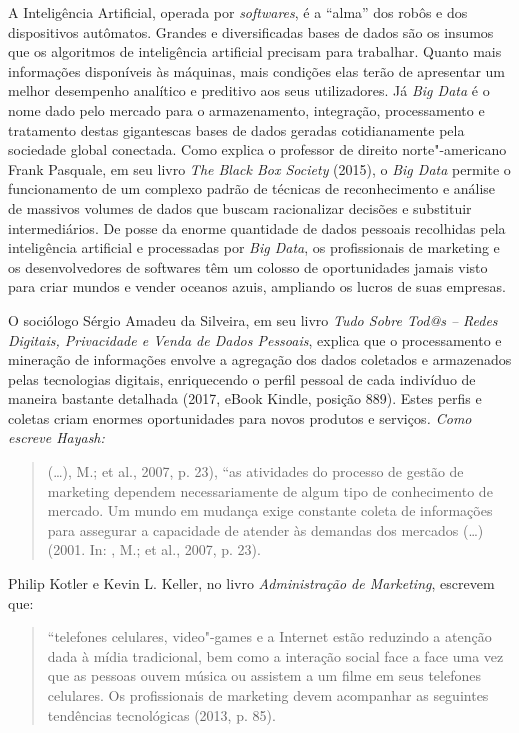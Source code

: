 A Inteligência Artificial, operada por \emph{softwares}, é a ``alma''
dos robôs e dos dispositivos autômatos. Grandes e diversificadas bases
de dados são os insumos que os algoritmos de inteligência artificial
precisam para trabalhar. Quanto mais informações disponíveis às
máquinas, mais condições elas terão de apresentar um melhor desempenho
analítico e preditivo aos seus utilizadores. Já \emph{Big Data} é o nome
dado pelo mercado para o armazenamento, integração, processamento e
tratamento destas gigantescas bases de dados geradas cotidianamente pela
sociedade global conectada. Como explica o professor de direito
norte"-americano Frank Pasquale, em seu livro \emph{The Black Box
Society} (2015), o \emph{Big Data} permite o funcionamento de um
complexo padrão de técnicas de reconhecimento e análise de massivos
volumes de dados que buscam racionalizar decisões e substituir
intermediários. De posse da enorme quantidade de dados pessoais
recolhidas pela inteligência artificial e processadas por \emph{Big
Data}, os profissionais de marketing e os desenvolvedores de softwares
têm um colosso de oportunidades jamais visto para criar mundos e vender
oceanos azuis, ampliando os lucros de suas empresas.

O sociólogo Sérgio Amadeu da Silveira, em seu livro \emph{Tudo Sobre Tod@s -- Redes Digitais, Privacidade e Venda
de Dados Pessoais}, explica que o processamento e mineração de
informações envolve a agregação dos dados coletados e armazenados pelas
tecnologias digitais, enriquecendo o perfil pessoal de cada indivíduo de
maneira bastante detalhada (2017, eBook Kindle, posição 889). Estes
perfis e coletas criam enormes oportunidades para novos produtos e
serviços\emph{. Como escreve Hayash:}

\begin{quote}
(\ldots{}), M.; et al., 2007, p. 23), ``as atividades do processo de
gestão de marketing dependem necessariamente de algum tipo de
conhecimento de mercado. Um mundo em mudança exige constante coleta de
informações para assegurar a capacidade de atender às demandas dos
mercados (\ldots{}) (2001. In: , M.; et al., 2007, p. 23).
\end{quote}

Philip Kotler e Kevin L. Keller, no livro \emph{Administração de
Marketing}, escrevem que:

\begin{quote}
``telefones celulares, video"-games e a Internet estão reduzindo a
atenção dada à mídia tradicional, bem como a interação social face a
face uma vez que as pessoas ouvem música ou assistem a um filme em seus
telefones celulares. Os profissionais de marketing devem acompanhar as
seguintes tendências tecnológicas (2013, p. 85).
\end{quote}


